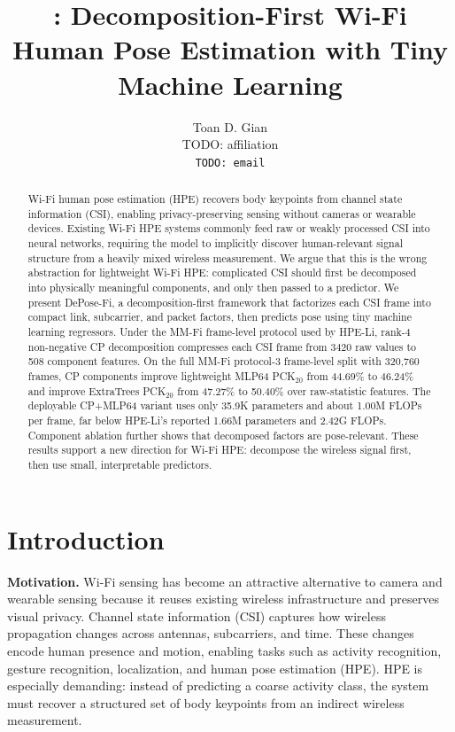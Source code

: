 \documentclass[letterpaper]{article}
\title{\method: Decomposition-First Wi-Fi Human Pose Estimation with Tiny Machine Learning}
\author{
Toan D. Gian\\
TODO: affiliation\\
\texttt{TODO: email}
}
\newcommand{\method}{DePose-Fi}
\begin{document}
\maketitle

\begin{abstract}
Wi-Fi human pose estimation (HPE) recovers body keypoints from channel state information (CSI), enabling privacy-preserving sensing without cameras or wearable devices. Existing Wi-Fi HPE systems commonly feed raw or weakly processed CSI into neural networks, requiring the model to implicitly discover human-relevant signal structure from a heavily mixed wireless measurement. We argue that this is the wrong abstraction for lightweight Wi-Fi HPE: complicated CSI should first be decomposed into physically meaningful components, and only then passed to a predictor. We present \method, a decomposition-first framework that factorizes each CSI frame into compact link, subcarrier, and packet factors, then predicts pose using tiny machine learning regressors. Under the MM-Fi frame-level protocol used by HPE-Li, rank-4 non-negative CP decomposition compresses each CSI frame from 3420 raw values to 508 component features. On the full MM-Fi protocol-3 frame-level split with 320,760 frames, CP components improve lightweight MLP64 PCK$_{20}$ from 44.69\% to 46.24\% and improve ExtraTrees PCK$_{20}$ from 47.27\% to 50.40\% over raw-statistic features. The deployable CP+MLP64 variant uses only 35.9K parameters and about 1.00M FLOPs per frame, far below HPE-Li's reported 1.66M parameters and 2.42G FLOPs. Component ablation further shows that decomposed factors are pose-relevant. These results support a new direction for Wi-Fi HPE: decompose the wireless signal first, then use small, interpretable predictors.
\end{abstract}

\section{Introduction}

\textbf{Motivation.}
Wi-Fi sensing has become an attractive alternative to camera and wearable sensing because it reuses existing wireless infrastructure and preserves visual privacy. Channel state information (CSI) captures how wireless propagation changes across antennas, subcarriers, and time. These changes encode human presence and motion, enabling tasks such as activity recognition, gesture recognition, localization, and human pose estimation (HPE). HPE is especially demanding: instead of predicting a coarse activity class, the system must recover a structured set of body keypoints from an indirect wireless measurement.
\end{document}
